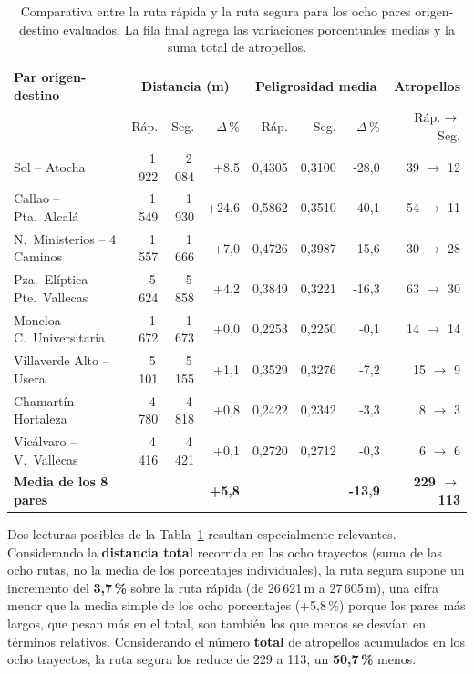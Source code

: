 \begin{table}[htbp]
\centering
\small
\begin{tabular}{lrrrrrrr}
\hline
\textbf{Par origen-destino} & \multicolumn{3}{c}{\textbf{Distancia (m)}} & \multicolumn{3}{c}{\textbf{Peligrosidad media}} & \textbf{Atropellos} \\
 & Ráp. & Seg. & $\Delta$\,\% & Ráp. & Seg. & $\Delta$\,\% & Ráp.$\to$Seg. \\
\hline
Sol -- Atocha                    & 1\,922 & 2\,084 & +8,5  & 0,4305 & 0,3100 & -28,0 & 39 $\to$ 12 \\
Callao -- Pta.\ Alcalá           & 1\,549 & 1\,930 & +24,6 & 0,5862 & 0,3510 & -40,1 & 54 $\to$ 11 \\
N.\ Ministerios -- 4 Caminos     & 1\,557 & 1\,666 & +7,0  & 0,4726 & 0,3987 & -15,6 & 30 $\to$ 28 \\
Pza.\ Elíptica -- Pte.\ Vallecas & 5\,624 & 5\,858 & +4,2  & 0,3849 & 0,3221 & -16,3 & 63 $\to$ 30 \\
Moncloa -- C.\ Universitaria     & 1\,672 & 1\,673 & +0,0  & 0,2253 & 0,2250 & -0,1  & 14 $\to$ 14 \\
Villaverde Alto -- Usera         & 5\,101 & 5\,155 & +1,1  & 0,3529 & 0,3276 & -7,2  & 15 $\to$ 9 \\
Chamartín -- Hortaleza           & 4\,780 & 4\,818 & +0,8  & 0,2422 & 0,2342 & -3,3  & 8 $\to$ 3 \\
Vicálvaro -- V.\ Vallecas        & 4\,416 & 4\,421 & +0,1  & 0,2720 & 0,2712 & -0,3  & 6 $\to$ 6 \\
\hline
\textbf{Media de los 8 pares}    &        &        & \textbf{+5,8} &        &        & \textbf{-13,9} & \textbf{229 $\to$ 113} \\
\hline
\end{tabular}
\caption{Comparativa entre la ruta rápida y la ruta segura para los ocho pares origen-destino evaluados. La fila final agrega las variaciones porcentuales medias y la suma total de atropellos.}
\label{tab:resultados_rutas}
\end{table}

Dos lecturas posibles de la Tabla~\ref{tab:resultados_rutas} resultan especialmente relevantes. Considerando la \textbf{distancia total} recorrida en los ocho trayectos (suma de las ocho rutas, no la media de los porcentajes individuales), la ruta segura supone un incremento del \textbf{3,7\,\%} sobre la ruta rápida (de 26\,621\,m a 27\,605\,m), una cifra menor que la media simple de los ocho porcentajes (+5,8\,\%) porque los pares más largos, que pesan más en el total, son también los que menos se desvían en términos relativos. Considerando el número \textbf{total} de atropellos acumulados en los ocho trayectos, la ruta segura los reduce de 229 a 113, un \textbf{50,7\,\%} menos.

